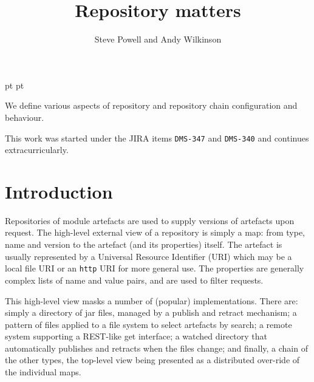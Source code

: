 \documentclass[a4paper,titlepage,twoside,12pt]{article}
\begin{document}
 pt
 pt

\title{Repository matters}
\author{Steve Powell and Andy Wilkinson}
\maketitle
\thispagestyle{myheadings}
\setcounter{page}{0}

We define various aspects of repository and repository chain configuration and behaviour.

This work was started under the JIRA items \texttt{DMS-347} and \texttt{DMS-340} and continues extracurricularly.


\newcommand{\true}{true}
\newcommand{\false}{false}
\renewcommand{\emptyset}{\varnothing}

\clearpage
\tableofcontents

\clearpage
{}

\section{Introduction}
Repositories of module artefacts are used to supply versions of artefacts upon request. The high-level external view of a repository is simply a map: from type, name and version to the artefact (and its properties) itself. The artefact is usually represented by a Universal Resource Identifier (URI) which may be a local file URI or an \texttt{http} URI for more general use. The properties are generally complex lists of name and value pairs, and are used to filter requests.

This high-level view masks a number of (popular) implementations. There are: simply a directory of jar files, managed by a publish and retract mechanism; a pattern of files applied to a file system to select artefacts by search; a remote system supporting a REST-like get interface; a watched directory that automatically publishes and retracts when the files change; and finally, a chain of the other types, the top-level view being presented as a distributed over-ride of the individual maps.
\end{document}
